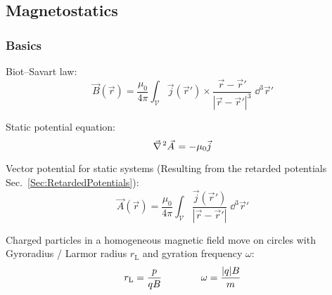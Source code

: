 	\subsection{Magnetostatics}
		\subsubsection{Basics}
			\noindent
			Biot--Savart law:
			\begin{equation}
				\vec{B}(\vec{r}) = \frac{\mu_0}{4\pi}\int_{\mathcal{V}} \vec{j}(\vec{r}')\times\frac{\vec{r}-\vec{r}'}{\left|\vec{r}-\vec{r}'\right|^3}\;\dd^3\vec{r}'
			\end{equation}

			\noindent
			Static potential equation:
			\begin{equation}
				\Nabla^2 \vec{A} = - \mu_0 \vec{j}
			\end{equation}

			\noindent
			Vector potential for static systems (Resulting from the retarded potentials Sec.~\ref{Sec:RetardedPotentials}):
			\begin{equation}
				\vec{A}(\vec{r}) = \frac{\mu_0}{4\pi} \int_{\mathcal{V}} \frac{\vec{j}(\vec{r}')}{\left|\vec{r}-\vec{r}'\right|} \;\dd^3\vec{r}'
			\end{equation}

			\noindent
			Charged particles in a homogeneous magnetic field move on circles with Gyroradius / Larmor radius $r_\text{L}$ and gyration frequency $\omega$:
			\begin{equation}
				\begin{aligned}
					r_\text{L} = \frac{p}{qB} &&\hspace{30pt}
					\omega = \frac{|q| B}{m}
				\end{aligned}
			\end{equation}

